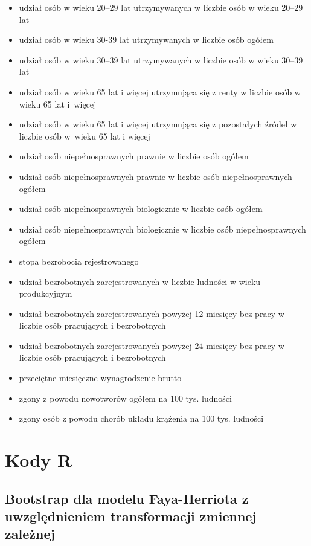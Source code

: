 \begin{itemize}
\item udział osób w wieku 20--29 lat utrzymywanych w liczbie osób  w wieku 20--29 lat
\item udział osób w wieku 30-39 lat utrzymywanych w liczbie osób ogółem
\item udział osób w wieku 30--39 lat utrzymywanych w liczbie osób  w wieku 30--39 lat
\item udział osób w wieku 65 lat i więcej utrzymująca się z renty w liczbie osób w wieku 65 lat i~więcej
\item udział osób w wieku 65 lat i więcej utrzymująca się z pozostałych źródeł w liczbie osób w~wieku 65 lat i więcej
\item udział osób niepełnosprawnych prawnie w liczbie osób ogółem
\item udział osób niepełnosprawnych prawnie w liczbie osób niepełnosprawnych ogółem
\item udział osób niepełnosprawnych biologicznie w liczbie osób ogółem
\item udział osób niepełnosprawnych biologicznie w liczbie osób niepełnosprawnych ogółem
\item stopa bezrobocia rejestrowanego
\item udział bezrobotnych zarejestrowanych w liczbie ludności w wieku produkcyjnym
\item udział bezrobotnych zarejestrowanych powyżej 12 miesięcy bez pracy w liczbie osób pracujących i bezrobotnych
\item udział bezrobotnych zarejestrowanych powyżej 24 miesięcy bez pracy w liczbie osób pracujących i bezrobotnych
\item przeciętne miesięczne wynagrodzenie brutto
\item zgony z powodu nowotworów ogółem na 100 tys. ludności
\item zgony osób z powodu chorób układu krążenia na 100 tys. ludności
\end{itemize}

\newpage

\section{Kody R}

\subsection*{Bootstrap dla modelu Faya-Herriota z uwzględnieniem transformacji zmiennej zależnej}

